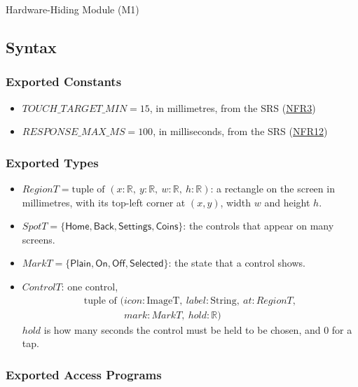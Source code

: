 \documentclass[10pt, titlepage]{article}
\newcommand{\srsurl}{https://team-hindsight.github.io/ophthamology-game/SRS/SRS.pdf}
\newcommand{\srsitemref}[2]{\href{\srsurl\#nameddest=#1}{#2}}
\newcommand{\R}{\mathbb{R}}
\newcommand{\T}[1]{\mathit{#1}}          %
\newcommand{\V}[1]{\mathsf{#1}}          %
\begin{document}
Hardware-Hiding Module (M1)

\subsection{Syntax}

\subsubsection{Exported Constants}

\begin{itemize}
\item $\T{TOUCH\_TARGET\_MIN} = 15$, in millimetres, from the SRS
  (\srsitemref{NFR_TouchTarget}{NFR3})
\item $\T{RESPONSE\_MAX\_MS} = 100$, in milliseconds, from the SRS
  (\srsitemref{NFR_Responsiveness}{NFR12})
\end{itemize}

\subsubsection{Exported Types}

\begin{itemize}
\item $\T{RegionT} = \text{tuple of } (x : \R,\ y : \R,\ w : \R,\ h : \R)$: a rectangle on the
  screen in millimetres, with its top-left corner at $(x, y)$, width $w$ and
  height $h$.
\item $\T{SpotT} = \{\V{Home}, \V{Back}, \V{Settings}, \V{Coins}\}$: the
  controls that appear on many screens.
\item $\T{MarkT} = \{\V{Plain}, \V{On}, \V{Off}, \V{Selected}\}$: the state
  that a control shows.
\item $\T{ControlT}$: one control,
  \[\begin{array}{l}
  \text{tuple of } (\T{icon} : \text{ImageT},\ \T{label} : \text{String},\
  \T{at} : \T{RegionT},\\
  \phantom{\text{tuple of } (}\T{mark} : \T{MarkT},\ \T{hold} : \R)
  \end{array}\] $\T{hold}$ is how many seconds the control must be held to be
  chosen, and 0 for a tap.
\end{itemize}

\subsubsection{Exported Access Programs}
\end{document}
